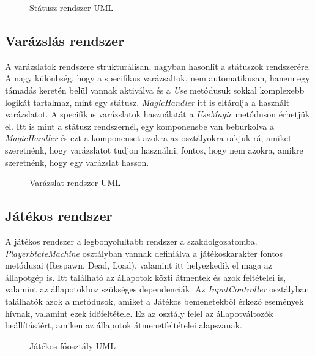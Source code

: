 \begin{figure}[H]
	\noindent{}
	\caption{Státusz rendszer UML}
	\label{StatusSystem}
\end{figure}

\subsection{Varázslás rendszer}
A varázslatok rendszere strukturálisan, nagyban hasonlít a státuszok rendszerére. A nagy különbség, hogy a specifikus varázsaltok, nem automatikusan, hanem egy támadás keretén belül vannak aktiválva és a \textit{Use} metódusuk sokkal komplexebb logikát tartalmaz, mint egy státusz. \textit{MagicHandler} itt is eltárolja a használt varázslatot. A specifikus varázslatok használatát a \textit{UseMagic} metóduson érhetjük el. Itt is mint a státusz rendszernél, egy komponensbe van beburkolva a \textit{MagicHandler} és ezt a komponenset azokra az osztályokra rakjuk rá, amiket szeretnénk, hogy varázslatot tudjon használni, fontos, hogy nem azokra, amikre szeretnénk, hogy egy varázslat hasson.

\begin{figure}[H]
	\noindent{}
	\caption{Varázslat rendszer UML}
	\label{MagicSystem}
\end{figure}

\subsection{Játékos rendszer}
A játékos rendszer a legbonyolultabb rendszer a szakdolgozatomba. \textit{PlayerStateMachine} osztályban vannak definiálva a játékoskarakter fontos metódusai (Respawn, Dead, Load), valamint itt helyezkedik el maga az állapotgép is. Itt található az állapotok közti átmentek és azok feltételei is, valamint az állapotokhoz szükséges dependenciák. Az \textit{InputController} osztályban találhatók azok a metódusok, amiket a Játékos bemenetekből érkező események hívnak, valamint ezek időfeltétele. Ez az osztály felel az állapotváltozók beállításáért, amiken az állapotok átmenetfeltételei alapszanak.

\begin{figure}[H]
	\noindent{}
	\caption{Játékos főosztály UML}
	\label{PlayerSystem1}
\end{figure}


